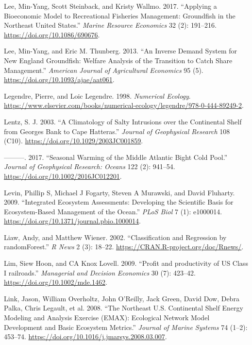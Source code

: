 \documentclass[
]{book}
\begin{document}
\leavevmode\hypertarget{ref-lee_applying_2017}{}%
Lee, Min-Yang, Scott Steinback, and Kristy Wallmo. 2017. ``Applying a Bioeconomic Model to Recreational Fisheries Management: Groundfish in the Northeast United States.'' \emph{Marine Resource Economics} 32 (2): 191--216. \url{https://doi.org/10.1086/690676}.

\leavevmode\hypertarget{ref-lee_inverse_2013}{}%
Lee, Min-Yang, and Eric M. Thunberg. 2013. ``An Inverse Demand System for New England Groundfish: Welfare Analysis of the Transition to Catch Share Management.'' \emph{American Journal of Agricultural Economics} 95 (5). \url{https://doi.org/10.1093/ajae/aat061}.

\leavevmode\hypertarget{ref-Legendre1998}{}%
Legendre, Pierre, and Loic Legendre. 1998. \emph{Numerical Ecology}. \url{https://www.elsevier.com/books/numerical-ecology/legendre/978-0-444-89249-2}.

\leavevmode\hypertarget{ref-lentz_climatology_2003}{}%
Lentz, S. J. 2003. ``A Climatology of Salty Intrusions over the Continental Shelf from Georges Bank to Cape Hatteras.'' \emph{Journal of Geophysical Research} 108 (C10). \url{https://doi.org/10.1029/2003JC001859}.

\leavevmode\hypertarget{ref-lentz_seasonal_2017}{}%
---------. 2017. ``Seasonal Warming of the Middle Atlantic Bight Cold Pool.'' \emph{Journal of Geophysical Research: Oceans} 122 (2): 941--54. \url{https://doi.org/10.1002/2016JC012201}.

\leavevmode\hypertarget{ref-levin_integrated_2009}{}%
Levin, Phillip S, Michael J Fogarty, Steven A Murawski, and David Fluharty. 2009. ``Integrated Ecosystem Assessments: Developing the Scientific Basis for Ecosystem-Based Management of the Ocean.'' \emph{PLoS Biol} 7 (1): e1000014. \url{https://doi.org/10.1371/journal.pbio.1000014}.

\leavevmode\hypertarget{ref-randomForest}{}%
Liaw, Andy, and Matthew Wiener. 2002. ``Classification and Regression by randomForest.'' \emph{R News} 2 (3): 18--22. \url{https://CRAN.R-project.org/doc/Rnews/}.

\leavevmode\hypertarget{ref-lim2009}{}%
Lim, Siew Hoon, and CA Knox Lovell. 2009. ``Profit and productivity of US Class I railroads.'' \emph{Managerial and Decision Economics} 30 (7): 423--42. \url{https://doi.org/10.1002/mde.1462}.

\leavevmode\hypertarget{ref-link_northeast_2008}{}%
Link, Jason, William Overholtz, John O'Reilly, Jack Green, David Dow, Debra Palka, Chris Legault, et al. 2008. ``The Northeast U.S. Continental Shelf Energy Modeling and Analysis Exercise (EMAX): Ecological Network Model Development and Basic Ecosystem Metrics.'' \emph{Journal of Marine Systems} 74 (1--2): 453--74. \url{https://doi.org/10.1016/j.jmarsys.2008.03.007}.
\end{document}
